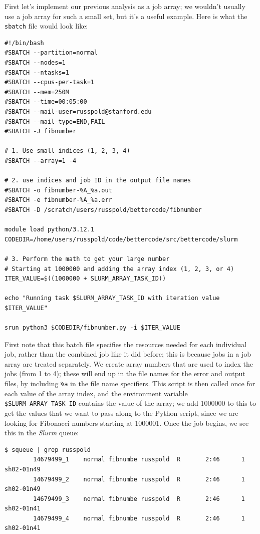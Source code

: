 First let's implement our previous analysis as a job array; we wouldn't usually use a job array for such a small set, but it's a useful example.  Here is what the \texttt{sbatch} file would look like:

\begin{lstlisting}[style=shell]
#!/bin/bash
#SBATCH --partition=normal
#SBATCH --nodes=1
#SBATCH --ntasks=1
#SBATCH --cpus-per-task=1
#SBATCH --mem=250M
#SBATCH --time=00:05:00
#SBATCH --mail-user=russpold@stanford.edu
#SBATCH --mail-type=END,FAIL
#SBATCH -J fibnumber

# 1. Use small indices (1, 2, 3, 4)
#SBATCH --array=1 -4

# 2. use indices and job ID in the output file names
#SBATCH -o fibnumber-%A_%a.out
#SBATCH -e fibnumber-%A_%a.err
#SBATCH -D /scratch/users/russpold/bettercode/fibnumber

module load python/3.12.1
CODEDIR=/home/users/russpold/code/bettercode/src/bettercode/slurm

# 3. Perform the math to get your large number
# Starting at 1000000 and adding the array index (1, 2, 3, or 4)
ITER_VALUE=$((1000000 + SLURM_ARRAY_TASK_ID))

echo "Running task $SLURM_ARRAY_TASK_ID with iteration value $ITER_VALUE"

srun python3 $CODEDIR/fibnumber.py -i $ITER_VALUE
\end{lstlisting}

First note that this batch file specifies the resources needed for each individual job, rather than the combined job like it did before; this is because jobs in a job array are treated separately.  We create array numbers that are used to index the jobs (from 1 to 4); these will end up in the file names for the error and output files, by including \texttt{\%a} in the file name specifiers.  This script is then called once for each value of the array index, and the environment variable \texttt{\$SLURM\_ARRAY\_TASK\_ID} contains the value of the array; we add 1000000 to this to get the values that we want to pass along to the Python script, since we are looking for Fibonacci numbers starting at 1000001. Once the job begins, we see this in the \textit{Slurm} queue:

\begin{lstlisting}[style=shell]
$ squeue | grep russpold
        14679499_1    normal fibnumbe russpold  R       2:46      1 sh02-01n49
        14679499_2    normal fibnumbe russpold  R       2:46      1 sh02-01n49
        14679499_3    normal fibnumbe russpold  R       2:46      1 sh02-01n41
        14679499_4    normal fibnumbe russpold  R       2:46      1 sh02-01n41
\end{lstlisting}

